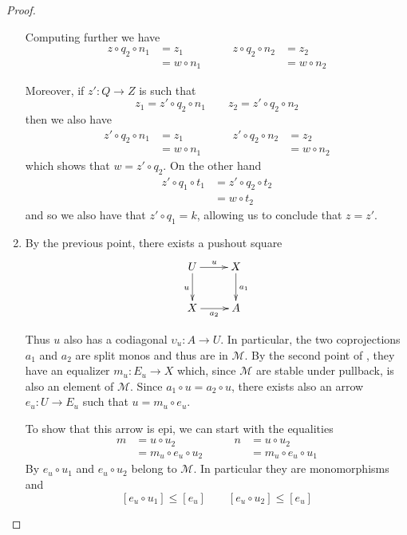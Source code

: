 \begin{proof}
\begin{enumerate}
Computing further we have
		\[\begin{split}
		z\circ q_2\circ n_1&=z_1\\&=w\circ n_1
		\end{split}\qquad 
		\begin{split}
			z\circ q_2\circ n_2&=z_2\\&=w\circ n_2
		\end{split}\]
		
		Moreover, if $z'\colon Q\to Z$ is such that
		\[z_1=z'\circ q_2\circ n_1 \qquad z_2=z'\circ q_2\circ n_2\]
		then we also have 
		\[\begin{split}
			z'\circ q_2\circ n_1&=z_1\\
			&=w\circ n_1 
		\end{split}\qquad \begin{split}
			z'\circ q_2\circ n_2&=z_2\\
			&=w\circ n_2
		\end{split}\]
		which shows that $w=z'\circ q_2$. On the other hand
		\[\begin{split}
			z'\circ q_1\circ t_1 & = z'\circ q_2\circ t_2\\&=w\circ t_2
		\end{split}\]
		and so we also have that $z'\circ q_1=k$, allowing us to conclude that $z=z'$. 
		
		\item By the previous point, there exists a pushout square		
		\[\xymatrix{U \ar[r]^{u} \ar[d]_{u}& X \ar[d]^{a_1} \\ X \ar[r]_{a_2}  & A}\]
		
		Thus $u$ also has a codiagonal $\upsilon_{u}\colon A\to U$. In particular, the two coprojections $a_1$ and $a_2$  are split monos and thus are in $\mathcal{M}$. By the second point of , they have an equalizer $m_u\colon E_u\to X$ which, since $\mathcal{M}$ are stable under pullback, is also an element of $\mathcal{M}$. Since $a_1\circ u= a_2\circ u$, there exists also an arrow $e_u\colon U\to E_u$ such that $u=m_u\circ e_u$. 
		
		To show that this arrow is epi, we can start with the equalities
		\[\begin{split}
			m&=u\circ u_2\\&=m_u\circ e_u\circ u_2
		\end{split} \qquad \begin{split}
			n&=u\circ u_2\\&=m_u\circ e_u\circ u_1
		\end{split}  \]
		By   $e_u\circ u_1$ and $e_u\circ u_2$ belong to $\mathcal{M}$. In particular they are monomorphisms and
		\[[e_u\circ u_1] \leq [e_u] \qquad [e_u\circ u_2] \leq [e_u]\]
		

\end{enumerate}
\end{proof}
